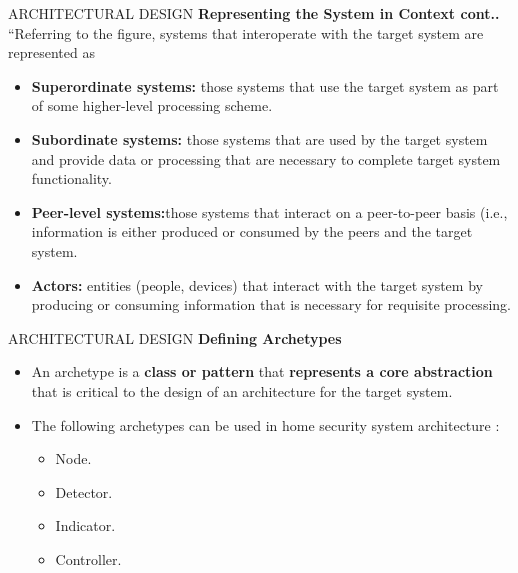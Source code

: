 \documentclass{beamer}
\begin{document}
\begin{frame}{ARCHITECTURAL DESIGN}
	\textbf{Representing the System in Context cont..}\\
	“Referring to the figure, systems that interoperate with
	the target system are represented as
	\begin{itemize}
		\item \textbf{Superordinate systems:} those systems that use the
		target system as part of some higher-level processing
		scheme.
			\item \textbf{Subordinate systems:} those systems that are used
		by the target system and provide data or processing
		that are necessary to complete target system
		functionality.
	\item \textbf{Peer-level systems:}those systems that interact on a
		peer-to-peer basis (i.e., information is either produced
		or consumed by the peers and the target system.
	\item \textbf{Actors:} entities (people, devices) that interact with
		the target system by producing or consuming
		information that is necessary for requisite processing.
	\end{itemize}
\end{frame}
\begin{frame}{ARCHITECTURAL DESIGN}
	\textbf{ Defining Archetypes}
	\begin{itemize}
		\item An archetype is a \textbf{class or pattern} that\textbf{ represents a
			core abstraction} that is critical to the design of an
		architecture for the target system.
		\item The following archetypes can be used in home security
		system architecture :
		\begin{itemize}
			\item Node.
			\item Detector.
			\item Indicator.
			\item Controller.
		\end{itemize}
	\end{itemize}
\end{frame}
\end{document}
